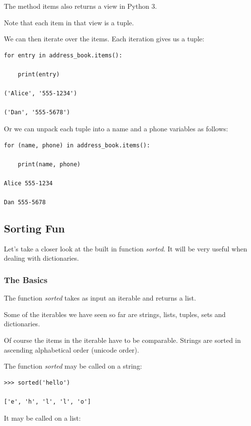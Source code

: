 \documentclass{article}
\begin{document}
The method items also returns  a view in Python 3.  

Note that each item in that view is a tuple.

We can then iterate over the items.  Each iteration gives us a tuple:

\begin{lstlisting}
for entry in address_book.items():

    print(entry)   

('Alice', '555-1234')

('Dan', '555-5678')
\end{lstlisting}

Or we can unpack each tuple into a name and a phone variables as follows:

\begin{lstlisting}
for (name, phone) in address_book.items():

    print(name, phone)  

Alice 555-1234

Dan 555-5678
\end{lstlisting}

\subsection{Sorting Fun}

Let's take a closer look at the built in function \textit{sorted}. It will be very useful when dealing with dictionaries.

\subsubsection{The Basics}

The function \textit{sorted} takes as input an iterable and returns a list. 

Some of the iterables we have seen so far are strings, lists, tuples, sets and dictionaries.

Of course the items in the iterable have to be comparable.  Strings are sorted in ascending alphabetical order (unicode order).

The function \textit{sorted} may be called on a string:

\begin{lstlisting}
>>> sorted('hello')

['e', 'h', 'l', 'l', 'o']
\end{lstlisting}

It may be called on a list:
\end{document}
